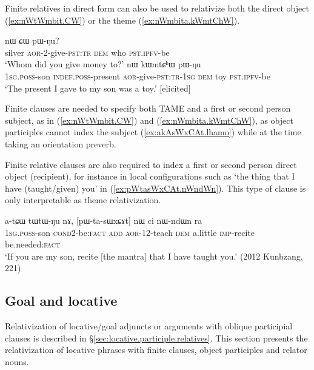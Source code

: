 Finite relatives in direct form can also be used to relativize both the direct object (\ref{ex:nWtWmbit.CW}) or the theme (\ref{ex:nWmbita.kWmtChW}). 

\begin{exe}
\ex 
\begin{xlist}
\ex \label{ex:nWtWmbit.CW}
 nɯ ɕɯ pɯ-ŋu? \\
silver \textsc{aor}-2-give-\textsc{pst}:\textsc{tr} \textsc{dem} who \textsc{pst}.\textsc{ipfv}-be \\
\glt `Whom did you give money to?'
\ex \label{ex:nWmbita.kWmtChW}
 nɯ kɯmtɕʰɯ pɯ-ŋu \\
 \textsc{1sg}.\textsc{poss}-son \textsc{indef}.\textsc{poss}-present \textsc{aor}-give-\textsc{pst}:\textsc{tr}-\textsc{1sg} \textsc{dem} toy \textsc{pst}.\textsc{ipfv}-be \\
 \glt `The present I gave to my son was a toy.' [elicited]
 \end{xlist} 
\end{exe} 

Finite clauses are needed to specify both TAME and a first or second person subject, as in (\ref{ex:nWtWmbit.CW}) and (\ref{ex:nWmbita.kWmtChW}), as object participles cannot index the subject (\ref{ex:akAsWxCAt.lhamo}) while at the time taking an orientation preverb.

Finite relative clauses are also required to index a first or second person direct object (recipient), for instance in local configurations such as  `the thing that I have (taught/given) you' in (\ref{ex:pWtasWxCAt.nWndWn}). This type of clause is only interpretable as theme relativization. 

\begin{exe}
\ex \label{ex:pWtasWxCAt.nWndWn}
\gll  a-tɕɯ tɯ\redp{}tɯ-ŋu nɤ, [pɯ-ta-sɯxɕɤt] nɯ ci nɯ-ndɯn ra \\
\textsc{1sg}.\textsc{poss}-son \textsc{cond}\redp{}2-be:\textsc{fact} \textsc{add} \textsc{aor}-1\fl{}2-teach \textsc{dem} a.little \textsc{imp}-recite be.needed:\textsc{fact} \\
\glt `If you are my son, recite [the mantra] that I have taught you.' (2012 Kunbzang, 221)
\end{exe} 


\subsection{Goal and locative} \label{sec:locative.relativization}
Relativization of locative/goal adjuncts or arguments with oblique participial clauses  is described in  §\ref{sec:locative.participle.relatives}. This section presents the relativization of locative phrases with finite clauses, object participles and relator nouns.
 

